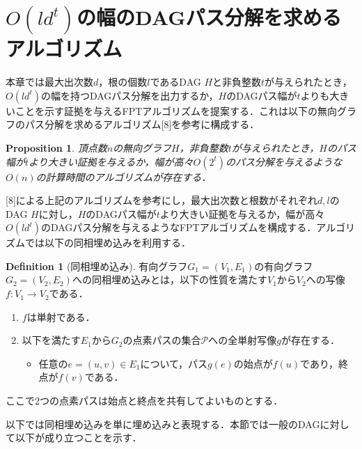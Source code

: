 \documentclass[master]{kuisthesis}		%
\theoremstyle{plain}
\newtheorem{proposition}{Proposition}
\theoremstyle{definition}
\newtheorem{definition*}{Definition}
\begin{document}
\section{$O(ld^t)$の幅のDAGパス分解を求めるアルゴリズム} %

本章では最大出次数$d$，根の個数$l$であるDAG $H$と非負整数$t$が与えられたとき，$O(ld^t)$の幅を持つDAGパス分解を出力するか，$H$のDAGパス幅が$t$よりも大きいことを示す証拠を与えるFPTアルゴリズムを提案する．これは以下の無向グラフのパス分解を求めるアルゴリズム[8]を参考に構成する．

\begin{proposition}\label{pathwidth algorithm of undirected graph}
    頂点数$n$の無向グラフ$H$，非負整数$t$が与えられたとき，$H$のパス幅が$t$より大きい証拠を与えるか，幅が高々$O(2^t)$のパス分解を与えるような$O(n)$の計算時間のアルゴリズムが存在する．
\end{proposition}

[8]による上記のアルゴリズムを参考にし，最大出次数と根数がそれぞれ$d, l$のDAG $H$に対し，$H$のDAGパス幅が$t$より大きい証拠を与えるか，幅が高々$O(ld^t)$のDAGパス分解を与えるようなFPTアルゴリズムを構成する．アルゴリズムでは以下の同相埋め込みを利用する．

\begin{definition*}[同相埋め込み]
    有向グラフ$G_1 = (V_1, E_1)$の有向グラフ$G_2 = (V_2, E_2)$への同相埋め込みとは，以下の性質を満たす$V_1$から$V_2$への写像$f:V_1 \rightarrow V_2$である．
    \begin{enumerate}
        \item $f$は単射である．
        \item 以下を満たす$E_1$から$G_2$の点素パスの集合$\mathcal{P}$への全単射写像$g$が存在する．
        \begin{itemize}
            \item 任意の$e = (u, v) \in E_1$について，パス$g(e)$の始点が$f(u)$であり，終点が$f(v)$である．
        \end{itemize}
    \end{enumerate}
    ここで2つの点素パスは始点と終点を共有してよいものとする．
\end{definition*}

以下では同相埋め込みを単に埋め込みと表現する．本節では一般のDAGに対して以下が成り立つことを示す．
\end{document}
